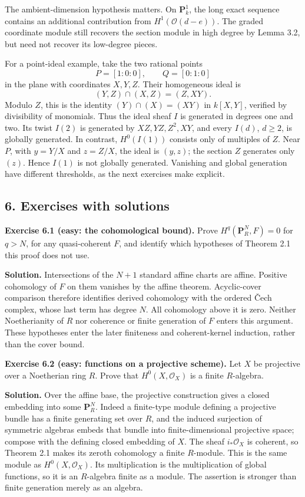 \documentclass[11pt]{article}
\begin{document}
The ambient-dimension hypothesis matters. On \(\mathbf P_k^1\), the long
exact sequence contains an additional contribution from
\(H^1(\mathcal O(d-e))\). The graded coordinate module still recovers
the section module in high degree by Lemma 3.2, but need not recover its
low-degree pieces.

For a point-ideal example, take the two rational points \[
P=[1:0:0],\qquad Q=[0:1:0]
\] in the plane with coordinates \(X,Y,Z\). Their homogeneous ideal is
\[
(Y,Z)\cap(X,Z)=(Z,XY).
\] Modulo \(Z\), this is the identity \((Y)\cap(X)=(XY)\) in \(k[X,Y]\),
verified by divisibility of monomials. Thus the ideal sheaf \(I\) is
generated in degrees one and two. Its twist \(I(2)\) is generated by
\(XZ,YZ,Z^2,XY\), and every \(I(d)\), \(d\ge2\), is globally generated.
In contrast, \(H^0(I(1))\) consists only of multiples of \(Z\). Near
\(P\), with \(y=Y/X\) and \(z=Z/X\), the ideal is \((y,z)\); the section
\(Z\) generates only \((z)\). Hence \(I(1)\) is not globally generated.
Vanishing and global generation have different thresholds, as the next
exercises make explicit.

\subsection{6. Exercises with solutions}\label{exercises-with-solutions}

\textbf{Exercise 6.1 (easy: the cohomological bound).} Prove
\(H^q(\mathbf P_R^N,F)=0\) for \(q>N\), for any quasi-coherent \(F\),
and identify which hypotheses of Theorem 2.1 this proof does not use.

\textbf{Solution.} Intersections of the \(N+1\) standard affine charts
are affine. Positive cohomology of \(F\) on them vanishes by the affine
theorem. Acyclic-cover comparison therefore identifies derived
cohomology with the ordered Čech complex, whose last term has degree
\(N\). All cohomology above it is zero. Neither Noetherianity of \(R\)
nor coherence or finite generation of \(F\) enters this argument. These
hypotheses enter the later finiteness and coherent-kernel induction,
rather than the cover bound.

\textbf{Exercise 6.2 (easy: functions on a projective scheme).} Let
\(X\) be projective over a Noetherian ring \(R\). Prove that
\(H^0(X,\mathcal O_X)\) is a finite \(R\)-algebra.

\textbf{Solution.} Over the affine base, the projective construction
gives a closed embedding into some \(\mathbf P_R^N\). Indeed a
finite-type module defining a projective bundle has a finite generating
set over \(R\), and the induced surjection of symmetric algebras embeds
that bundle into finite-dimensional projective space; compose with the
defining closed embedding of \(X\). The sheaf \(i_*\mathcal O_X\) is
coherent, so Theorem 2.1 makes its zeroth cohomology a finite
\(R\)-module. This is the same module as \(H^0(X,\mathcal O_X)\). Its
multiplication is the multiplication of global functions, so it is an
\(R\)-algebra finite as a module. The assertion is stronger than finite
generation merely as an algebra.
\end{document}
